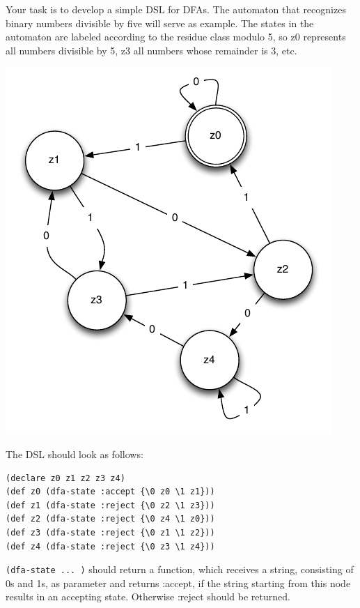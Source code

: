 \documentclass[11pt,a4paper]{article}
\begin{document}
\begin{exercise}[DFA]
Your task is to develop a simple DSL for DFAs.
The automaton that recognizes binary numbers divisible by five will serve as example.
The states in the automaton are labeled according to the residue class modulo 5,
so z0 represents all numbers divisible by 5, z3 all numbers whose remainder is 3, etc.

\begin{minipage}{.4\textwidth}
\includegraphics[scale=0.5]{dfa.png} 
\end{minipage}%
\begin{minipage}{.6\textwidth}
The DSL should look as follows:

\begin{verbatim}
(declare z0 z1 z2 z3 z4)
(def z0 (dfa-state :accept {\0 z0 \1 z1}))
(def z1 (dfa-state :reject {\0 z2 \1 z3}))
(def z2 (dfa-state :reject {\0 z4 \1 z0}))
(def z3 (dfa-state :reject {\0 z1 \1 z2}))
(def z4 (dfa-state :reject {\0 z3 \1 z4}))
\end{verbatim}

\verb|(dfa-state ... )| should return a function,
which receives a string, consisting of 0s and 1s, as parameter and returns :accept,
if the string starting from this node results in an accepting state.
Otherwise :reject should be returned.
\end{minipage}


\end{exercise}
\end{document}
